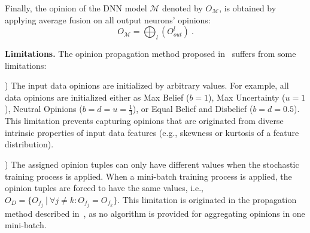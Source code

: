Finally, the opinion of the DNN model $\mathcal{M}$ denoted by $O_{\mathcal{M}}$, is obtained by applying average fusion on all output neurons' opinions:
\begin{equation}
O_{\mathcal{M}} = \bigoplus_l(O_{out}^l)\ .
\label{model_eq}
\end{equation}

\vspace{2mm}
\noindent
\textbf{Limitations.} 
The opinion propagation method proposed in~\cite{hope} suffers from some limitations:

) The input data opinions are initialized by arbitrary values. For example, all data opinions are initialized either as Max Belief ($b=1$), Max Uncertainty ($u=1$), Neutral Opinions ($b=d=u=\frac{1}{3}$), or Equal Belief and Disbelief ($b=d=0.5$). 
This limitation prevents capturing opinions that are originated from diverse intrinsic properties of input data features (e.g., skewness or kurtosis of a feature distribution). 

) The assigned opinion tuples can only have different values when the stochastic training process is applied. When a mini-batch training process is applied, the opinion tuples are forced to have the same values, i.e., $O_D = \{O_{f_j}\ |\ \forall j \neq k: O_{f_j}=O_{f_k}\}$. This limitation is originated in the propagation method described in~\cite{hope}, as no algorithm is provided for aggregating opinions in one mini-batch.





